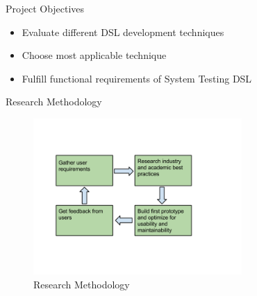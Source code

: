 \begin{frame}{Project Objectives}
\begin{itemize}
\item Evaluate different DSL development techniques
\item Choose most applicable technique
\item Fulfill functional requirements of System Testing DSL
\end{itemize}
\end{frame}


\begin{frame}{Research Methodology}
\begin{figure}[H]
  \centering
    \includegraphics[width=300px]{figures/research.png}
  \caption{Research Methodology}
\end{figure}
\end{frame}

